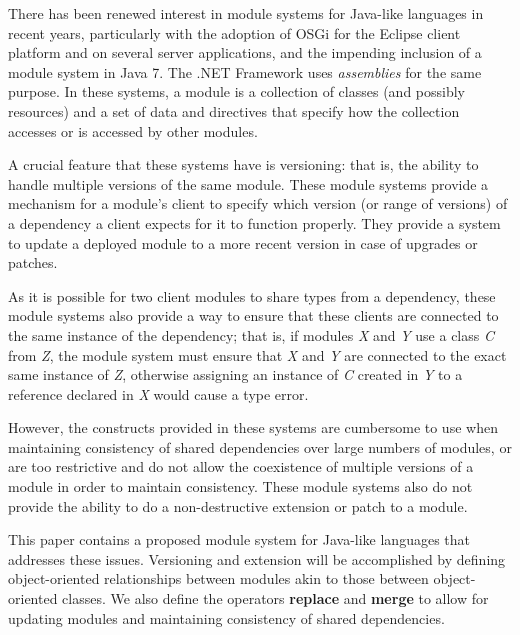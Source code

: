





There has been renewed interest in module systems for Java-like languages in recent
years, particularly with the adoption of OSGi \cite{OSGi4} for the Eclipse \cite{eclipse}
client platform and on several server applications, and the impending inclusion
of a module system \cite{JSR277, JSR294} in Java 7. The .NET Framework uses \textit{assemblies} \cite{netassemblies}
for the same purpose. In these systems, a module is
a collection of classes (and possibly resources) and a set of data and directives that specify how the collection
accesses or is accessed by other modules. 

A crucial feature that these systems have
is versioning: that is, the ability to handle multiple versions of the same module.
These module systems provide a mechanism for a module's client to specify which version
(or range of versions) of a dependency a client expects for it to function properly.
They provide a system to update a deployed module to a more recent version in case of upgrades or patches.

As it is possible for two client modules to share types from a dependency, these module systems also provide a way to ensure that these clients are connected to the same instance
of the dependency; that is, if modules \textit{X} and \textit{Y} use a class \textit{C} from \textit{Z}, the module system
must ensure that \textit{X} and \textit{Y} are connected to the exact same instance of \textit{Z}, 
otherwise assigning an instance of \textit{C} created in \textit{Y} to a reference declared in \textit{X}
would cause a type error. 

However, the constructs provided in these systems are cumbersome to use when maintaining
consistency of shared dependencies over large numbers of modules, or are too restrictive and
do not allow the coexistence of multiple versions of a module in order to maintain consistency.
These module systems also do not provide the ability to do a non-destructive extension or patch to a module.

This paper contains a proposed module system for Java-like languages that addresses these issues.
Versioning and extension will be accomplished by defining object-oriented relationships between modules akin
to those between object-oriented classes. We also define the operators \textbf{replace} and \textbf{merge}
to allow for updating modules and maintaining consistency of shared dependencies.

